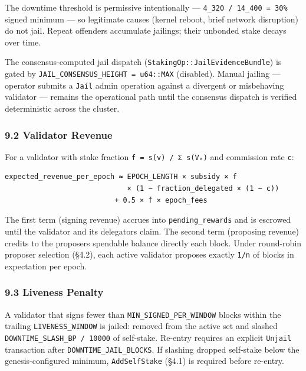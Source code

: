 \documentclass[11pt,a4paper]{article}
\begin{document}
The downtime threshold is permissive intentionally ---
\texttt{4\_320\ /\ 14\_400\ =\ 30\%} signed minimum --- so legitimate
causes (kernel reboot, brief network disruption) do not jail. Repeat
offenders accumulate jailings; their unbonded stake decays over time.

The consensus-computed jail dispatch
(\texttt{StakingOp::JailEvidenceBundle}) is gated by
\texttt{JAIL\_CONSENSUS\_HEIGHT\ =\ u64::MAX} (disabled). Manual jailing
--- operator submits a \texttt{Jail} admin operation against a divergent
or misbehaving validator --- remains the operational path until the
consensus dispatch is verified deterministic across the cluster.

\hypertarget{92-validator-revenue}{%
\subsubsection{9.2 Validator Revenue}\label{92-validator-revenue}}

For a validator with stake fraction \texttt{f\ =\ s(v)\ /\ Σ\ s(Vₐ)} and
commission rate \texttt{c}:

\begin{verbatim}
expected_revenue_per_epoch ≈ EPOCH_LENGTH × subsidy × f
                             × (1 − fraction_delegated × (1 − c))
                          + 0.5 × f × epoch_fees
\end{verbatim}

The first term (signing revenue) accrues into \texttt{pending\_rewards}
and is escrowed until the validator and its delegators claim. The second
term (proposing revenue) credits to the proposer\textquotesingle s
spendable balance directly each block. Under round-robin proposer
selection (§4.2), each active validator proposes exactly \texttt{1/n} of
blocks in expectation per epoch.

\hypertarget{93-liveness-penalty}{%
\subsubsection{9.3 Liveness Penalty}\label{93-liveness-penalty}}

A validator that signs fewer than \texttt{MIN\_SIGNED\_PER\_WINDOW}
blocks within the trailing \texttt{LIVENESS\_WINDOW} is jailed: removed
from the active set and slashed \texttt{DOWNTIME\_SLASH\_BP\ /\ 10000}
of self-stake. Re-entry requires an explicit \texttt{Unjail} transaction
after \texttt{DOWNTIME\_JAIL\_BLOCKS}. If slashing dropped self-stake
below the genesis-configured minimum, \texttt{AddSelfStake} (§4.1) is
required before re-entry.
\end{document}
